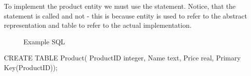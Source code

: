 
To implement the product entity we must use the \textbf{} statement. Notice, that the statement is called  and not  - this is because entity is used to refer to the abstract representation and table to refer to the actual implementation.

\begin{figure}[H]
    \caption{Example SQL} \label{fig:sql_example}
\end{figure}


\begin{sql}
CREATE TABLE Product(
    ProductID integer,
    Name text,
    Price real,
    Primary Key(ProductID));
\end{sql}